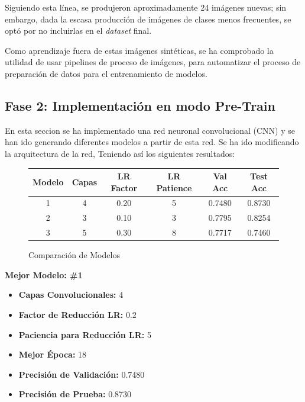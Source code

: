 \noindent
Siguiendo esta línea, 
se produjeron aproximadamente 24 imágenes nuevas; sin embargo, dada la escasa producción 
de imágenes de clases menos frecuentes, se optó por no incluirlas en el \textit{dataset} final.

\quad

\noindent
Como aprendizaje fuera de estas imágenes sintéticas, se ha comprobado la utilidad de usar pipelines de
proceso de imágenes, para automatizar el proceso de preparación de datos para el entrenamiento de modelos.


\subsection{Fase 2: Implementación en modo Pre-Train}

\noindent
En esta seccion se ha implementado una red neuronal convolucional (CNN) y se han
ido generando diferentes modelos a partir de esta red. Se ha ido modificando la arquitectura de la red,
Teniendo así los siguientes resultados:


\begin{figure}[H]
    \centering
    \begin{tabular}{|c|c|c|c|c|c|}
        \hline
        \textbf{Modelo} & \textbf{Capas} & \textbf{LR Factor} & \textbf{LR Patience} & \textbf{Val Acc} & \textbf{Test Acc} \\ \hline
        1 & 4 & 0.20 & 5 & 0.7480 & 0.8730 \\ \hline
        2 & 3 & 0.10 & 3 & 0.7795 & 0.8254 \\ \hline
        3 & 5 & 0.30 & 8 & 0.7717 & 0.7460 \\ \hline
    \end{tabular}
    \caption{Comparación de Modelos}
\end{figure}

\begin{center}
    \textbf{Mejor Modelo: \#1}
\end{center}

\begin{itemize}
    \item \textbf{Capas Convolucionales:} 4
    \item \textbf{Factor de Reducción LR:} 0.2
    \item \textbf{Paciencia para Reducción LR:} 5
    \item \textbf{Mejor Época:} 18
    \item \textbf{Precisión de Validación:} 0.7480
    \item \textbf{Precisión de Prueba:} 0.8730
\end{itemize}

